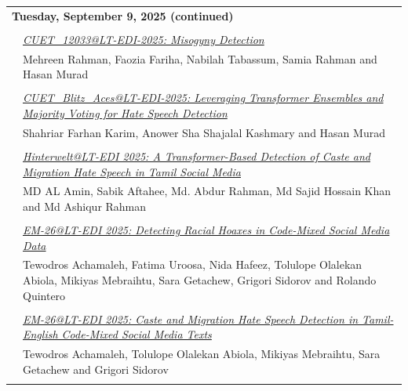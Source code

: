 \documentclass[11pt,oneside]{book}
\begin{document}
    
    \begin{tabular}{p{24mm}p{124mm}}
    \multicolumn{2}{l}{\bf Tuesday, September 9, 2025 (continued)} \\\\
          
                      & \hyperlink{page.127}{\emph{CUET\_12033@LT-EDI-2025: Misogyny Detection}}\\
        & Mehreen Rahman\index{Rahman}, Faozia Fariha\index{Fariha}, Nabilah Tabassum\index{Tabassum}, Samia Rahman\index{Rahman} and Hasan Murad\index{Murad}\\\\
                
                      & \hyperlink{page.133}{\emph{CUET\_Blitz\_Aces@LT-EDI-2025: Leveraging Transformer Ensembles and Majority Voting for Hate Speech Detection}}\\
        & Shahriar Farhan Karim\index{Karim}, Anower Sha Shajalal Kashmary\index{Kashmary} and Hasan Murad\index{Murad}\\\\
                
                      & \hyperlink{page.140}{\emph{Hinterwelt@LT-EDI 2025: A Transformer-Based Detection of Caste and Migration Hate Speech in Tamil Social Media}}\\
        & MD AL Amin\index{Amin}, Sabik Aftahee\index{Aftahee}, Md. Abdur Rahman\index{Rahman}, Md Sajid Hossain Khan\index{Khan} and Md Ashiqur Rahman\index{Rahman}\\\\
                
                      & \hyperlink{page.146}{\emph{EM-26@LT-EDI 2025: Detecting Racial Hoaxes in Code-Mixed Social Media Data}}\\
        & Tewodros Achamaleh\index{Achamaleh}, Fatima Uroosa\index{Uroosa}, Nida Hafeez\index{Hafeez}, Tolulope Olalekan Abiola\index{Abiola}, Mikiyas Mebraihtu\index{Mebraihtu}, Sara Getachew\index{Getachew}, Grigori Sidorov\index{Sidorov} and Rolando Quintero\index{Quintero}\\\\
                
                      & \hyperlink{page.152}{\emph{EM-26@LT-EDI 2025: Caste and Migration Hate Speech Detection in Tamil-English Code-Mixed Social Media Texts}}\\
        & Tewodros Achamaleh\index{Achamaleh}, Tolulope Olalekan Abiola\index{Abiola}, Mikiyas Mebraihtu\index{Mebraihtu}, Sara Getachew\index{Getachew} and Grigori Sidorov\index{Sidorov}\\\\
                

\end{tabular}
\end{document}
